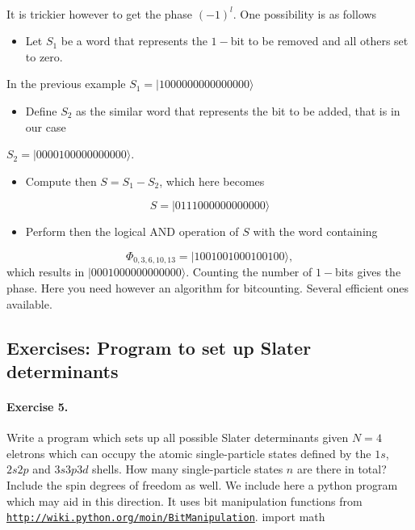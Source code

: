 \documentclass[%
twoside,                 %
final,                   %
10pt]{article}
\begin{document}
\paragraph{}
It is trickier however to get the phase $(-1)^l$. 
One possibility is as follows
\begin{itemize}
\item Let $S_1$ be a word that represents the $1-$bit to be removed and all others set to zero.
\end{itemize}

\noindent
In the previous example $S_1=|1000000000000000\rangle$
\begin{itemize}
\item Define $S_2$ as the similar word that represents the bit to be added, that is in our case
\end{itemize}

\noindent
$S_2=|0000100000000000\rangle$.
\begin{itemize}
\item Compute then $S=S_1-S_2$, which here becomes
\end{itemize}

\noindent
\[
S=|0111000000000000\rangle
\]
\begin{itemize}
\item Perform then the logical AND operation of $S$ with the word containing 
\end{itemize}

\noindent
\[
\Phi_{0,3,6,10,13} = |1001001000100100\rangle,
\]
which results in $|0001000000000000\rangle$. Counting the number of $1-$bits gives the phase.  Here you need however an algorithm for bitcounting. Several efficient ones available.







\subsection{Exercises: Program to set up Slater determinants}

\paragraph{Exercise 5.}

Write a program which sets up all possible Slater determinants given $N=4$ eletrons which can occupy
the atomic single-particle states defined by the $1s$, $2s2p$ and $3s3p3d$ shells. How many single-particle
states $n$ are there in total?  Include the spin degrees of freedom as well.
We include here a python program which may aid in this direction. It uses bit manipulation functions from \href{{http://wiki.python.org/moin/BitManipulation}}{\nolinkurl{http://wiki.python.org/moin/BitManipulation}}.
\bpycod
import math
\end{document}
